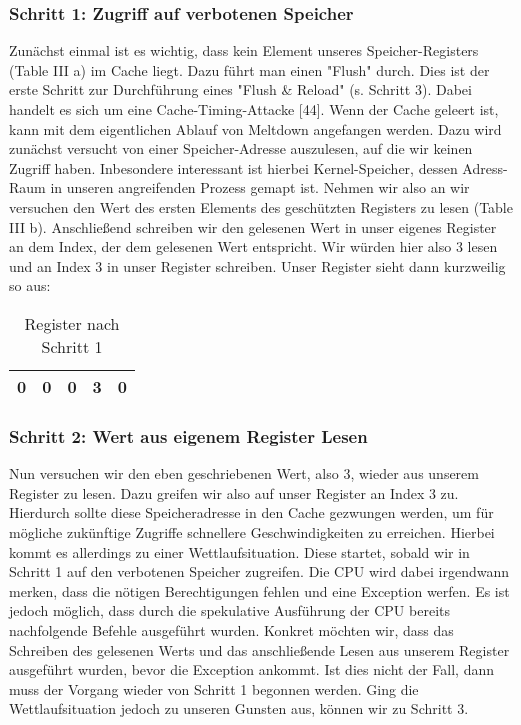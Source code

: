 \documentclass[conference,10pt,a4paper,twocolumn]{IEEEtran}
\begin{document}
\subsubsection{Schritt 1: Zugriff auf verbotenen Speicher}
Zunächst einmal ist es wichtig, dass kein Element unseres Speicher-Registers (Table III a) im Cache liegt. Dazu führt man einen "Flush" durch. Dies ist der erste Schritt zur Durchführung eines "Flush {\&} Reload" (s. Schritt 3). Dabei handelt es sich um eine Cache-Timing-Attacke [44]. Wenn der Cache geleert ist, kann mit dem eigentlichen Ablauf von Meltdown angefangen werden. Dazu wird zunächst versucht von einer Speicher-Adresse auszulesen, auf die wir keinen Zugriff haben. Inbesondere interessant ist hierbei Kernel-Speicher, dessen Adress-Raum in unseren angreifenden Prozess gemapt ist. Nehmen wir also an wir versuchen den  Wert des ersten Elements des geschützten Registers zu lesen (Table III b). Anschließend schreiben wir den gelesenen Wert in unser eigenes Register an dem Index, der dem gelesenen Wert entspricht. Wir würden hier also 3 lesen und an Index 3 in unser Register schreiben. Unser Register sieht dann kurzweilig so aus:

\begin{table}[h!]
\centering
\caption{Register nach Schritt 1}
\resizebox{8cm}{!} {
  \begin{tabular}{ | p{1cm} | p{1cm} | p{1cm} | p{1cm} | p{1cm} |}
    \hline
    0 & 0 & 0 & 3 & 0 \\
    \hline
  \end{tabular}
}

\end{table}

\bigskip
\subsubsection{Schritt 2: Wert aus eigenem Register Lesen}
Nun versuchen wir den eben geschriebenen Wert, also 3, wieder aus unserem Register zu lesen. Dazu greifen wir also auf unser Register an Index 3 zu. Hierdurch sollte diese Speicheradresse in den Cache gezwungen werden, um für mögliche zukünftige Zugriffe schnellere Geschwindigkeiten zu erreichen. Hierbei kommt es allerdings zu einer Wettlaufsituation. Diese startet, sobald wir in Schritt 1 auf den verbotenen Speicher zugreifen. Die CPU wird dabei irgendwann merken, dass die nötigen Berechtigungen fehlen und eine Exception werfen. Es ist jedoch möglich, dass durch die spekulative Ausführung der CPU bereits nachfolgende Befehle ausgeführt wurden. Konkret möchten wir, dass das Schreiben des gelesenen Werts und das anschließende Lesen aus unserem Register ausgeführt wurden, bevor die Exception ankommt. Ist dies nicht der Fall, dann muss der Vorgang wieder von Schritt 1 begonnen werden. Ging die Wettlaufsituation jedoch zu unseren Gunsten aus, können wir zu Schritt 3.
\end{document}
